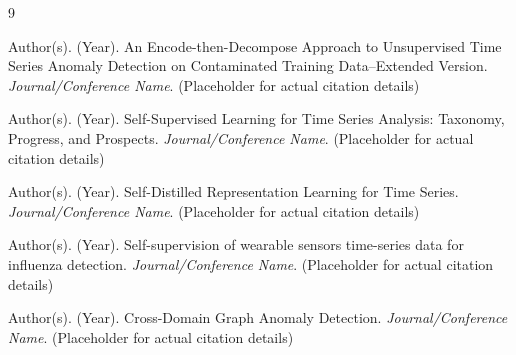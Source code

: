 \documentclass{article}
\begin{document}
\begin{thebibliography}{9}

Author(s). (Year). An Encode-then-Decompose Approach to Unsupervised Time Series Anomaly Detection on Contaminated Training Data--Extended Version. \textit{Journal/Conference Name}. (Placeholder for actual citation details)

Author(s). (Year). Self-Supervised Learning for Time Series Analysis: Taxonomy, Progress, and Prospects. \textit{Journal/Conference Name}. (Placeholder for actual citation details)

Author(s). (Year). Self-Distilled Representation Learning for Time Series. \textit{Journal/Conference Name}. (Placeholder for actual citation details)

Author(s). (Year). Self-supervision of wearable sensors time-series data for influenza detection. \textit{Journal/Conference Name}. (Placeholder for actual citation details)

Author(s). (Year). Cross-Domain Graph Anomaly Detection. \textit{Journal/Conference Name}. (Placeholder for actual citation details)

\end{thebibliography}
\end{document}
